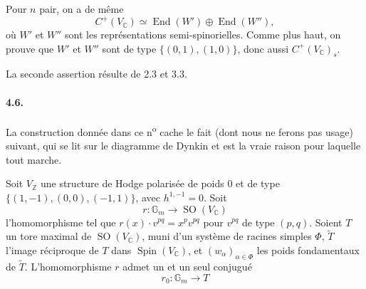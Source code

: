 \documentclass[10pt,leqno]{article}
\newcommand{\C}{\mathbb{C}}
\newcommand{\Z}{\mathbb{Z}}
\newcommand{\Gm}{\mathbb{G}_m}
\newcommand{\End}{\operatorname{End}}
\newcommand{\SO}{\operatorname{SO}}
\newcommand{\Spin}{\operatorname{Spin}}
\begin{document}
Pour $n$ pair, on a de même
\[
C^+(V_\C)\simeq\End(W')\oplus\End(W''),
\]
où $W'$ et $W''$ sont les représentations semi-spinorielles. Comme plus haut, on prouve que $W'$ et $W''$ sont de type $\{(0,1),(1,0)\}$, donc aussi $C^+(V_\C)_s$.

La seconde assertion résulte de 2.3 et 3.3.

\paragraph{4.6.} La construction donnée dans ce n\textsuperscript{o} cache le fait (dont nous ne ferons pas usage) suivant, qui se lit sur le diagramme de Dynkin et est la vraie raison pour laquelle tout marche.

Soit $V_\Z$ une structure de Hodge polarisée de poids $0$ et de type $\{(1,-1),(0,0),(-1,1)\}$, avec $h^{1,-1}=0$. Soit
\[
r:\Gm\longrightarrow\SO(V_\C)
\]
l'homomorphisme tel que $r(x)\cdot v^{pq}=x^p v^{pq}$ pour $v^{pq}$ de type $(p,q)$. Soient $T$ un tore maximal de $\SO(V_\C)$, muni d'un système de racines simples $\Phi$, $\widetilde T$ l'image réciproque de $T$ dans $\Spin(V_\C)$, et $(w_\alpha)_{\alpha\in\Phi}$ les poids fondamentaux de $\widetilde T$. L'homomorphisme $r$ admet un et un seul conjugué
\[
r_0:\Gm\longrightarrow T
\]

\clearpage
\end{document}

